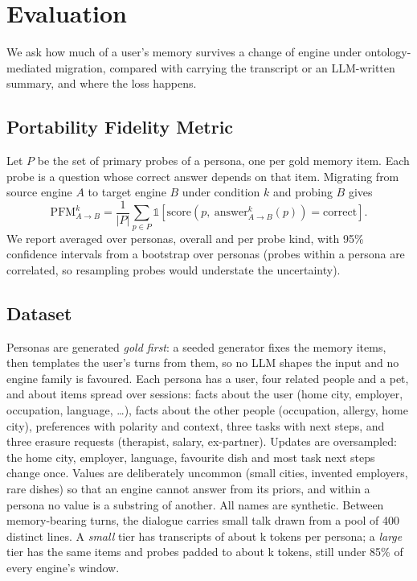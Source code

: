 \section{Evaluation}\label{sec:evaluation}

We ask how much of a user's memory survives a change of engine under ontology-mediated migration,
compared with carrying the transcript or an LLM-written summary, and where the loss happens.

\subsection{Portability Fidelity Metric}

Let $P$ be the set of primary probes of a persona, one per gold memory item. Each probe is a
question whose correct answer depends on that item. Migrating from source engine $A$ to target
engine $B$ under condition $k$ and probing $B$ gives
\begin{equation}
  \mathrm{PFM}^{k}_{A\to B} = \frac{1}{|P|}\sum_{p\in P}
    \mathbb{1}\left[\mathrm{score}\left(p,\ \mathrm{answer}^{k}_{A\to B}(p)\right)=\mathrm{correct}\right].
\end{equation}
We report \PFM averaged over personas, overall and per probe kind, with 95\% confidence intervals
from a bootstrap over personas (probes within a persona are correlated, so resampling probes would
understate the uncertainty).

\subsection{Dataset}

Personas are generated \emph{gold first}: a seeded generator fixes the memory items, then templates
the user's turns from them, so no LLM shapes the input and no engine family is favoured. Each
persona has a user, four related people and a pet, and about  items spread
over sessions: facts about the user (home city, employer, occupation, language, \dots), facts about
the other people (occupation, allergy, home city), preferences with polarity and context, three
tasks with next steps, and three erasure requests (therapist, salary, ex-partner). Updates are
oversampled: the home city, employer, language, favourite dish and most task next steps change
once. Values are deliberately uncommon (small cities, invented employers, rare dishes) so that an
engine cannot answer from its priors, and within a persona no value is a substring of another.
All names are synthetic. Between memory-bearing turns, the dialogue carries small talk drawn from
a pool of 400 distinct lines. A \emph{small} tier has transcripts of about k
tokens per persona; a \emph{large} tier has the same items and probes padded to about
k tokens,
still under 85\% of every engine's window.

